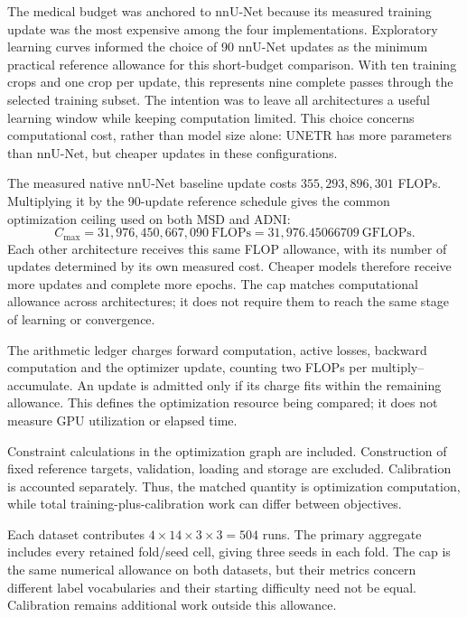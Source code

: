 \documentclass[12pt,a4paper]{article}
\begin{document}
The medical budget was anchored to nnU-Net because its measured training
update was the most expensive among the four implementations. Exploratory
learning curves informed the choice of 90 nnU-Net updates as the minimum
practical reference allowance for this short-budget comparison. With ten
training crops and one crop per update, this represents nine complete
passes through the selected training subset. The intention was to leave
all architectures a useful learning window while keeping computation
limited. This choice concerns computational cost, rather than model size
alone: UNETR has more parameters than nnU-Net, but cheaper updates in
these configurations.

The measured native nnU-Net baseline update costs
$355{,}293{,}896{,}301$ FLOPs. Multiplying it by the 90-update reference
schedule gives the common optimization ceiling used on both MSD and ADNI:
\begin{equation}
 C_{\max}=31{,}976{,}450{,}667{,}090\ \mathrm{FLOPs}
          =31{,}976.45066709\ \mathrm{GFLOPs}.
\label{eq:main-numerical-cap}
\end{equation}
Each other architecture receives this same FLOP allowance, with its
number of updates determined by its own measured cost. Cheaper models
therefore receive more updates and complete more epochs. The cap matches
computational allowance across architectures; it does not require them
to reach the same stage of learning or convergence.

The arithmetic ledger charges forward computation, active losses,
backward computation and the optimizer update, counting two FLOPs per
multiply--accumulate. An update is admitted only if its charge fits
within the remaining allowance. This defines the optimization resource
being compared; it does not measure GPU utilization or elapsed time.

Constraint calculations in the optimization graph are included.
Construction of fixed reference targets, validation,
loading and storage are excluded. Calibration is accounted separately.
Thus, the matched quantity is optimization computation, while total
training-plus-calibration work can differ between objectives.

Each dataset contributes $4\times14\times3\times3=504$ runs.
The primary aggregate includes every retained fold/seed cell, giving
three seeds in each fold. The cap is the same numerical allowance on
both datasets, but their metrics concern different label vocabularies
and their starting difficulty need not be equal. Calibration remains
additional work outside this allowance.
\end{document}
